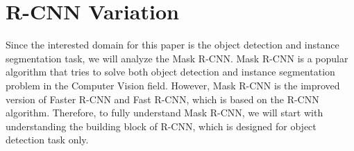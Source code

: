 \chapter{R-CNN Variation} \label{chap:rcnn_variation}

Since the interested domain for this paper is the object detection and instance segmentation task, we will analyze the Mask R-CNN. Mask R-CNN is a popular algorithm that tries to solve both object detection and instance segmentation problem in the Computer Vision field. However, Mask R-CNN is the improved version of Faster R-CNN and Fast R-CNN, which is based on the R-CNN algorithm. Therefore, to fully understand Mask R-CNN, we will start with understanding the building block of R-CNN, which is designed for object detection task only.







